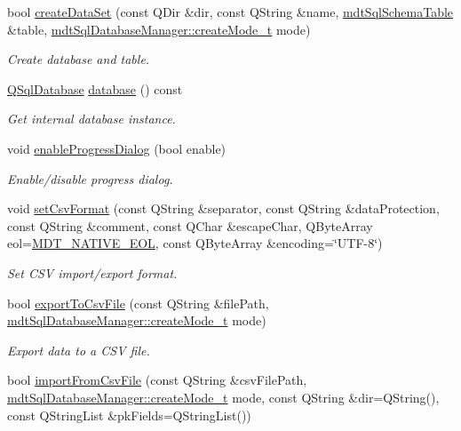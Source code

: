 \begin{DoxyCompactItemize}
bool \hyperlink{classmdt_data_table_manager_ae813c6c4323a1949d489a24c07e914fa}{create\-Data\-Set} (const Q\-Dir \&dir, const Q\-String \&name, \hyperlink{classmdt_sql_schema_table}{mdt\-Sql\-Schema\-Table} \&table, \hyperlink{classmdt_sql_database_manager_a2f5b46d67a88095053a5edfc415c7418}{mdt\-Sql\-Database\-Manager\-::create\-Mode\-\_\-t} mode)
\begin{DoxyCompactList}\small\item\em Create database and table. \end{DoxyCompactList}\item 
\hyperlink{class_q_sql_database}{Q\-Sql\-Database} \hyperlink{classmdt_data_table_manager_a9026c9d3d102246af243b68c815fba04}{database} () const 
\begin{DoxyCompactList}\small\item\em Get internal database instance. \end{DoxyCompactList}\item 
void \hyperlink{classmdt_data_table_manager_a139611cc21836438053226b1d7576201}{enable\-Progress\-Dialog} (bool enable)
\begin{DoxyCompactList}\small\item\em Enable/disable progress dialog. \end{DoxyCompactList}\item 
void \hyperlink{classmdt_data_table_manager_af14013b42dc0f84d37d4d1483f18d8c4}{set\-Csv\-Format} (const Q\-String \&separator, const Q\-String \&data\-Protection, const Q\-String \&comment, const Q\-Char \&escape\-Char, Q\-Byte\-Array eol=\hyperlink{mdt_csv_file_8h_af4d889780ff51b630e15bc9848df527c}{M\-D\-T\-\_\-\-N\-A\-T\-I\-V\-E\-\_\-\-E\-O\-L}, const Q\-Byte\-Array \&encoding=\char`\"{}U\-T\-F-\/8\char`\"{})
\begin{DoxyCompactList}\small\item\em Set C\-S\-V import/export format. \end{DoxyCompactList}\item 
bool \hyperlink{classmdt_data_table_manager_abe733f071ca77579522823598e79dd9a}{export\-To\-Csv\-File} (const Q\-String \&file\-Path, \hyperlink{classmdt_sql_database_manager_a2f5b46d67a88095053a5edfc415c7418}{mdt\-Sql\-Database\-Manager\-::create\-Mode\-\_\-t} mode)
\begin{DoxyCompactList}\small\item\em Export data to a C\-S\-V file. \end{DoxyCompactList}\item 
bool \hyperlink{classmdt_data_table_manager_a668cc3d94e6aa5dab406a0fd319351af}{import\-From\-Csv\-File} (const Q\-String \&csv\-File\-Path, \hyperlink{classmdt_sql_database_manager_a2f5b46d67a88095053a5edfc415c7418}{mdt\-Sql\-Database\-Manager\-::create\-Mode\-\_\-t} mode, const Q\-String \&dir=Q\-String(), const Q\-String\-List \&pk\-Fields=Q\-String\-List())

\end{DoxyCompactItemize}
